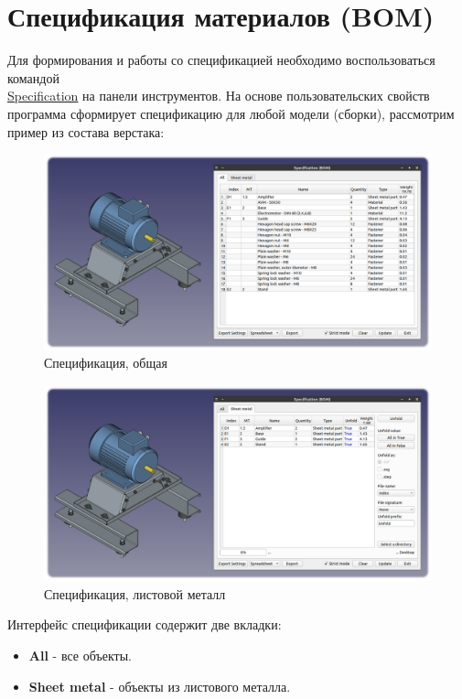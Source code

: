 \documentclass[a4paper,12pt]{article}
\begin{document}
\pagebreak



\section{Спецификация материалов (BOM)}
Для формирования и работы со спецификацией необходимо воспользоваться командой\\\hyperref[sec:4]{Specification} на панели инструментов. На основе пользовательских свойств программа сформирует спецификацию для любой модели (сборки), рассмотрим пример из состава верстака:

\begin{figure}[htp]
\centering
\includegraphics[width=1.0\textwidth]{img/specification_all.png}
\caption{Спецификация, общая}
\label{sec:specification_all}
\end{figure}

\begin{figure}[htp]
\centering
\includegraphics[width=1.0\textwidth]{img/specification_sm.png}
\caption{Спецификация, листовой металл}
\label{sec:specification_sm}
\end{figure}

\begin{flushleft}Интерфейс спецификации содержит две вкладки:\end{flushleft}
\begin{itemize}
	\item \textbf{All} - все объекты.
	\item \textbf{Sheet metal} - объекты из листового металла.
\end{itemize}
\end{document}
